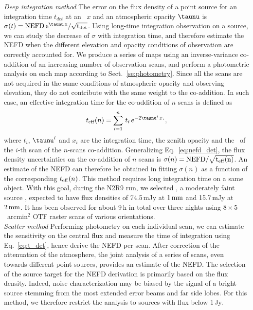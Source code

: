 \noindent \emph{Deep integration method} The error on the flux density of a
point source for an integration time $t_{det}$ at an \airmass\ $x$
and an atmospheric opacity $\taunu$ is
$\sigma(t) = \rm{NEFD}\,e^{\taunu \, x}/\sqrt{t_{\rm{det}}}$.
Using long-time integration observation on a source, we can study the
decrease of $\sigma$ with integration time, and
therefore estimate the NEFD when the different elevation and opacity conditions of
observation are correctly accounted for.  We produce a series of maps using an
inverse-variance co-addition of an increasing number of observation
scans, and perform a photometric analysis on each map according to
Sect.~\ref{se:photometry}. Since
all the scans are not acquired in the same conditions of atmospheric
opacity and observing elevation, they do not contribute with the same
weight to the co-addition. In such case, an effective integration time
for the co-addition of $n$ scans is defined as
%
\begin{equation}
t_{\rm{eff}}(n) = \sum_{i=1}^{n}\, t_i\,  e^{-2\taunu^i\, x_i},
\label{eq:sigma_tau_w8}
\end{equation}
%
where $t_i$, $\taunu^i$ and $x_i$ are the integration time, the zenith
opacity and the \airmass\ of the $i$-th scan of the $n$-scans
co-addition. Generalizing Eq.~\ref{eq:nefd_det},
the flux density uncertainties on the co-addition of $n$ scans is
$\sigma(n) = \rm{NEFD}/\sqrt{t_{\rm{eff}}(n)}$. An estimate of the
NEFD can therefore be obtained in fitting
$\sigma(n)$ as a function of the corresponding $t_{\rm{eff}}(n)$. This
method requires long integration time
on a same object. With this goal, during the N2R9 run, we selected \hls, a
moderately faint source
\citep{2012A&A...538L...4C}, expected to have flux densities of 74.5\,mJy at $1\,\rm{mm}$
and 15.7\,mJy at $2\, \rm{mm}$. %
It has been observed for about 9\,h in
total over three nights using $8 \times 5$~arcmin$^2$ OTF raster scans of various
orientations.\\

\noindent \emph{Scatter method} Performing photometry on each individual scan,
we can estimate the sensitivity on the central flux and measure the time of
integration using Eq.~\ref{eq:t_det}, hence derive the NEFD per
scan. After correction of the attenuation of the atmosphere, the joint
analysis of a series of scans, even towards different point sources, provides 
an estimate of the NEFD. The selection of the source target
for the NEFD derivation is primarily based on the flux density. Indeed, noise
characterization may be biased {\lp by the signal of a bright source
stemming from the most extended error beams and far side lobes.}
For this method, we therefore restrict the
analysis to sources with flux below 1\,Jy.

